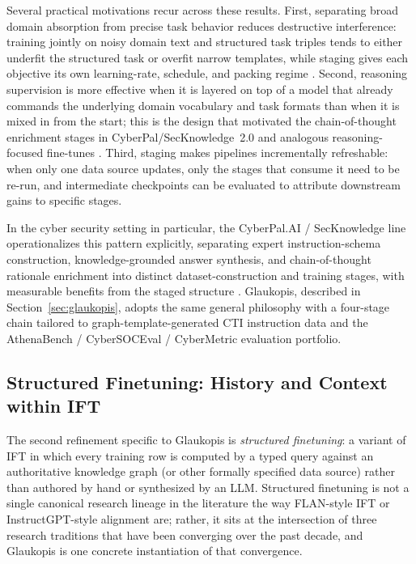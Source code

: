 \documentclass[unnumsec,webpdf,contemporary,large]{oup-authoring-template}
\theoremstyle{thmstyleone}
\theoremstyle{thmstyletwo}
\theoremstyle{thmstylethree}
\begin{document}
Several practical motivations recur across these results. First, separating broad domain absorption from precise task behavior reduces destructive interference: training jointly on noisy domain text and structured task triples tends to either underfit the structured task or overfit narrow templates, while staging gives each objective its own learning-rate, schedule, and packing regime \cite{gururangan2020dontstop,ouyang2022instructgpt}. Second, reasoning supervision is more effective when it is layered on top of a model that already commands the underlying domain vocabulary and task formats than when it is mixed in from the start; this is the design that motivated the chain-of-thought enrichment stages in CyberPal/SecKnowledge~2.0 and analogous reasoning-focused fine-tunes \cite{wei2022cot,levi2025toward}. Third, staging makes pipelines incrementally refreshable: when only one data source updates, only the stages that consume it need to be re-run, and intermediate checkpoints can be evaluated to attribute downstream gains to specific stages.

In the cyber security setting in particular, the CyberPal.AI / SecKnowledge line operationalizes this pattern explicitly, separating expert instruction-schema construction, knowledge-grounded answer synthesis, and chain-of-thought rationale enrichment into distinct dataset-construction and training stages, with measurable benefits from the staged structure \cite{levi2024cyberpal,levi2025toward}. Glaukopis, described in Section~\ref{sec:glaukopis}, adopts the same general philosophy with a four-stage chain tailored to graph-template-generated CTI instruction data and the AthenaBench / CyberSOCEval / CyberMetric evaluation portfolio.

\subsection{Structured Finetuning: History and Context within IFT}
\label{sec:ift-structured}

The second refinement specific to Glaukopis is \emph{structured finetuning}: a variant of IFT in which every training row is computed by a typed query against an authoritative knowledge graph (or other formally specified data source) rather than authored by hand or synthesized by an LLM. Structured finetuning is not a single canonical research lineage in the literature the way FLAN-style IFT or InstructGPT-style alignment are; rather, it sits at the intersection of three research traditions that have been converging over the past decade, and Glaukopis is one concrete instantiation of that convergence.
\end{document}
